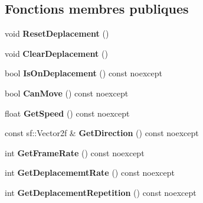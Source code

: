 \subsection*{Fonctions membres publiques}
\begin{DoxyCompactItemize}
\item 
\mbox{\label{classmy_1_1MoovableObject_a4302b691f78b37b7c316085ed45f7ac9}} 
void {\bfseries Reset\+Deplacement} ()
\item 
\mbox{\label{classmy_1_1MoovableObject_a5df53e0f738ed579d60fd177d1a5d536}} 
void {\bfseries Clear\+Deplacement} ()
\item 
\mbox{\label{classmy_1_1MoovableObject_ad3d84238f50e6a0fb50b8e91c55a9f23}} 
bool {\bfseries Is\+On\+Deplacement} () const noexcept
\item 
\mbox{\label{classmy_1_1MoovableObject_aa74659c36cf79efa1e8ef68485e0b240}} 
bool {\bfseries Can\+Move} () const noexcept
\item 
\mbox{\label{classmy_1_1MoovableObject_a0da6d199a21b7bd02b744e73f0ba9db2}} 
float {\bfseries Get\+Speed} () const noexcept
\item 
\mbox{\label{classmy_1_1MoovableObject_a29752f95b08d211af58337468cfa00ac}} 
const sf\+::\+Vector2f \& {\bfseries Get\+Direction} () const noexcept
\item 
\mbox{\label{classmy_1_1MoovableObject_a38ed98b7521553a560426dd9ca19c1b0}} 
int {\bfseries Get\+Frame\+Rate} () const noexcept
\item 
\mbox{\label{classmy_1_1MoovableObject_a4a1c2fa789043425bc0aa5d276788a89}} 
int {\bfseries Get\+Deplacememt\+Rate} () const noexcept
\item 
\mbox{\label{classmy_1_1MoovableObject_abfad2bb10fec55f3a2d1e3f371ce6259}} 
int {\bfseries Get\+Deplacement\+Repetition} () const noexcept
\item 
\mbox{\label{classmy_1_1MoovableObject_ad248f892b458765604e3f9832a60c146}} 

\end{DoxyCompactItemize}
